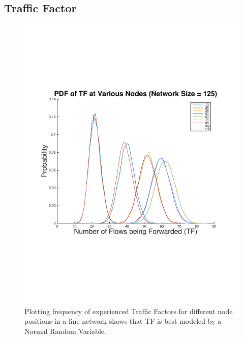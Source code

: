\subsection{Traffic Factor}

\begin{figure}
\begin{centering}
    \includegraphics[scale=0.4, clip=true, trim=15mm 65mm 20mm 65mm]{figures/TF_PDFs_line_net_125.pdf}
    \caption{Plotting frequency of experienced Traffic Factors for different node positions in a line network shows that TF is best modeled by a Normal Random Variable. }
    \label{fig:TF_PDFs_line_net}
\end{centering}
\end{figure}

